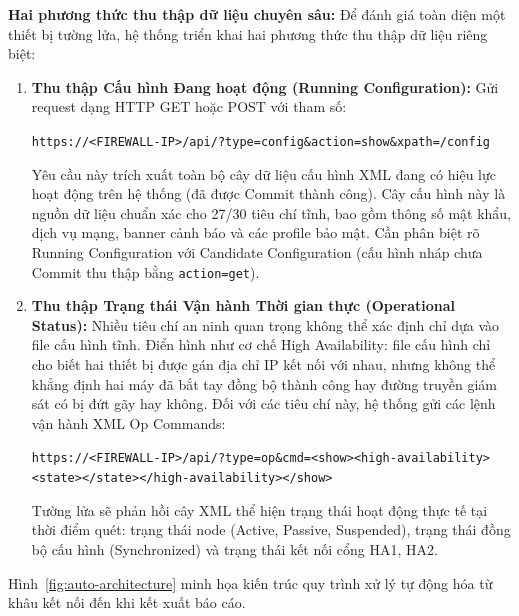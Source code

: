 \documentclass[12pt,a4paper]{article}
\begin{document}
\noindent\textbf{Hai phương thức thu thập dữ liệu chuyên sâu:}
Để đánh giá toàn diện một thiết bị tường lửa, hệ thống triển khai hai phương thức thu thập dữ liệu riêng biệt:
\begin{enumerate}
    \item \textbf{Thu thập Cấu hình Đang hoạt động (Running Configuration):}
    Gửi request dạng HTTP GET hoặc POST với tham số:
    \begin{center}
    \texttt{https://<FIREWALL-IP>/api/?type=config\&action=show\&xpath=/config}
    \end{center}
    Yêu cầu này trích xuất toàn bộ cây dữ liệu cấu hình XML đang có hiệu lực hoạt động trên hệ thống (đã được Commit thành công). Cây cấu hình này là nguồn dữ liệu chuẩn xác cho 27/30 tiêu chí tĩnh, bao gồm thông số mật khẩu, dịch vụ mạng, banner cảnh báo và các profile bảo mật. Cần phân biệt rõ Running Configuration với Candidate Configuration (cấu hình nháp chưa Commit thu thập bằng \texttt{action=get}).
    \item \textbf{Thu thập Trạng thái Vận hành Thời gian thực (Operational Status):}
    Nhiều tiêu chí an ninh quan trọng không thể xác định chỉ dựa vào file cấu hình tĩnh. Điển hình như cơ chế High Availability: file cấu hình chỉ cho biết hai thiết bị được gán địa chỉ IP kết nối với nhau, nhưng không thể khẳng định hai máy đã bắt tay đồng bộ thành công hay đường truyền giám sát có bị đứt gãy hay không. Đối với các tiêu chí này, hệ thống gửi các lệnh vận hành XML Op Commands:
    \begin{center}
    \texttt{https://<FIREWALL-IP>/api/?type=op\&cmd=<show><high-availability><state></state></high-availability></show>}
    \end{center}
    Tường lửa sẽ phản hồi cây XML thể hiện trạng thái hoạt động thực tế tại thời điểm quét: trạng thái node (Active, Passive, Suspended), trạng thái đồng bộ cấu hình (Synchronized) và trạng thái kết nối cổng HA1, HA2.
\end{enumerate}

Hình~\ref{fig:auto-architecture} minh họa kiến trúc quy trình xử lý tự động hóa từ khâu kết nối đến khi kết xuất báo cáo.
\end{document}
